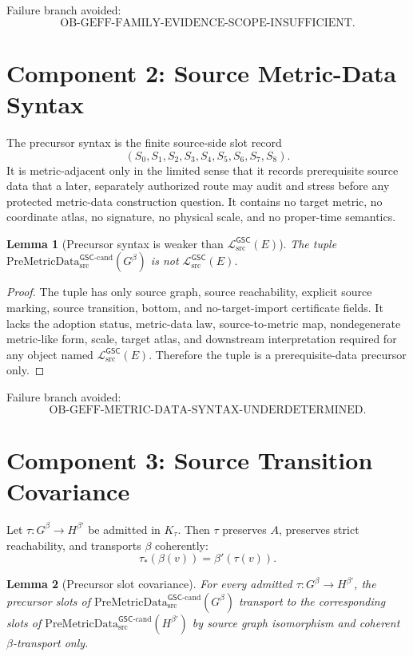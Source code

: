 \documentclass[11pt]{article}
\newcommand{\PreMetricData}{\mathrm{PreMetricData}_{\mathrm{src}}^{\mathsf{GSC}\mbox{-}\mathrm{cand}}}
\newcommand{\MetricData}{\mathcal{L}_{\mathrm{src}}^{\mathsf{GSC}}}
\newcommand{\Gbeta}{G^\beta}
\newcommand{\OBGEFF}{\mathrm{OB\mbox{-}GEFF}}
\newtheorem{lemma}{Lemma}
\begin{document}
Failure branch avoided:
\[
  \OBGEFF\text{-FAMILY-EVIDENCE-SCOPE-INSUFFICIENT}.
\]

\section{Component 2: Source Metric-Data Syntax}

The precursor syntax is the finite source-side slot record
\[
  (S_0,S_1,S_2,S_3,S_4,S_5,S_6,S_7,S_8).
\]
It is metric-adjacent only in the limited sense that it records prerequisite
source data that a later, separately authorized route may audit and stress
before any protected metric-data construction question. It contains no target
metric, no coordinate atlas, no signature, no physical scale, and no
proper-time semantics.

\begin{lemma}[Precursor syntax is weaker than \(\MetricData(E)\)]
The tuple \(\PreMetricData(\Gbeta)\) is not \(\MetricData(E)\).
\end{lemma}

\begin{proof}
The tuple has only source graph, source reachability, explicit source marking,
source transition, bottom, and no-target-import certificate fields. It lacks
the adoption status, metric-data law, source-to-metric map, nondegenerate
metric-like form, scale, target atlas, and downstream interpretation required
for any object named \(\MetricData(E)\). Therefore the tuple is a
prerequisite-data precursor only.
\end{proof}

Failure branch avoided:
\[
  \OBGEFF\text{-METRIC-DATA-SYNTAX-UNDERDETERMINED}.
\]

\section{Component 3: Source Transition Covariance}

Let \(\tau:\Gbeta\to H^{\beta'}\) be admitted in \(K_\tau\). Then \(\tau\)
preserves \(A\), preserves strict reachability, and transports \(\beta\)
coherently:
\[
  \tau_\ast(\beta(v))=\beta'(\tau(v)).
\]

\begin{lemma}[Precursor slot covariance]
For every admitted \(\tau:\Gbeta\to H^{\beta'}\), the precursor slots of
\(\PreMetricData(\Gbeta)\) transport to the corresponding slots of
\(\PreMetricData(H^{\beta'})\) by source graph isomorphism and coherent
\(\beta\)-transport only.
\end{lemma}
\end{document}
